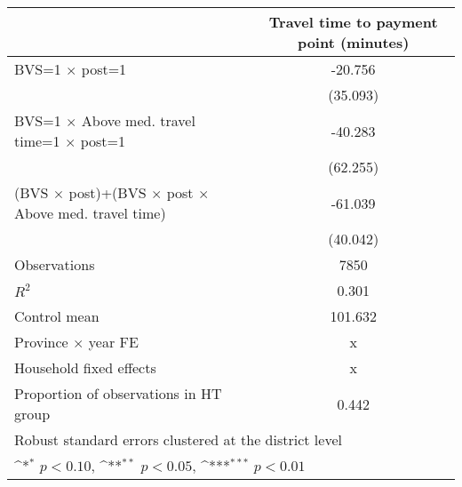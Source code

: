 {
\def\sym#1{\ifmmode^{#1}\else\(^{#1}\)\fi}
\begin{tabular}{l*{1}{c}}
\toprule
                    &\multicolumn{1}{c}{Travel time to payment point (minutes)}\\
\midrule
BVS=1 $\times$ post=1&     -20.756         \\
                    &    (35.093)         \\
\addlinespace
BVS=1 $\times$ Above med. travel time=1 $\times$ post=1&     -40.283         \\
                    &    (62.255)         \\
\addlinespace
\hline (BVS $\times$ post)+(BVS $\times$  post $\times$ Above med. travel time)&     -61.039         \\
                    &    (40.042)         \\
\midrule
Observations        &        7850         \\
\(R^{2}\)           &       0.301         \\
Control mean        &     101.632         \\
Province $\times$  year FE&           x         \\
Household fixed effects&           x         \\
Proportion of observations in HT group&       0.442         \\
\bottomrule
\multicolumn{2}{l}{\footnotesize Robust standard errors clustered at the district level}\\
\multicolumn{2}{l}{\footnotesize \sym{*} \(p<0.10\), \sym{**} \(p<0.05\), \sym{***} \(p<0.01\)}\\
\end{tabular}
}

